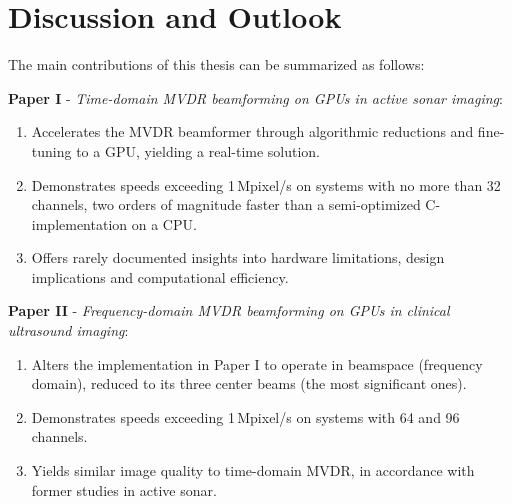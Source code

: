 
\endofdump

\ifRootBuild\else
  
  \makeglossaries
\fi



\chapter{Discussion and Outlook}

The main contributions of this thesis can be summarized as follows:

\textbf{Paper I} - \textit{Time-domain MVDR beamforming on GPUs in active sonar imaging}:
\begin{enumerate}
\item Accelerates the MVDR beamformer through algorithmic reductions and fine-tuning to a GPU, yielding a real-time solution.
\item Demonstrates speeds exceeding 1\,Mpixel/s on systems with no more than 32 channels, two orders of magnitude faster than a semi-optimized C-implementation on a CPU.
\item Offers rarely documented insights into hardware limitations, design implications and computational efficiency.
\end{enumerate}
% 
% 


\textbf{Paper II} - \textit{Frequency-domain MVDR beamforming on GPUs in clinical ultrasound imaging}:
\begin{enumerate}
\item Alters the implementation in Paper I to operate in beamspace (frequency domain), reduced to its three center beams (the most significant ones).
\item Demonstrates speeds exceeding 1\,Mpixel/s on systems with 64 and 96 channels.
\item Yields similar image quality to time-domain MVDR, in accordance with former studies in active sonar.
\end{enumerate}

